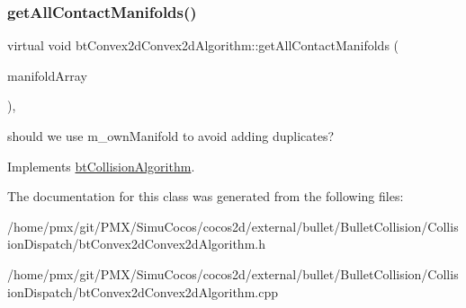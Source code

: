 \subsubsection{\texorpdfstring{get\+All\+Contact\+Manifolds()}{getAllContactManifolds()}\hspace{0.1cm}{\footnotesize\ttfamily [2/2]}}
{\footnotesize\ttfamily virtual void bt\+Convex2d\+Convex2d\+Algorithm\+::get\+All\+Contact\+Manifolds (\begin{DoxyParamCaption}\item[{\hyperlink{classbtAlignedObjectArray}{bt\+Manifold\+Array} \&}]{manifold\+Array }\end{DoxyParamCaption})\hspace{0.3cm}{\ttfamily [inline]}, {\ttfamily [virtual]}}

should we use m\+\_\+own\+Manifold to avoid adding duplicates? 

Implements \hyperlink{classbtCollisionAlgorithm}{bt\+Collision\+Algorithm}.



The documentation for this class was generated from the following files\+:\begin{DoxyCompactItemize}
\item 
/home/pmx/git/\+P\+M\+X/\+Simu\+Cocos/cocos2d/external/bullet/\+Bullet\+Collision/\+Collision\+Dispatch/bt\+Convex2d\+Convex2d\+Algorithm.\+h\item 
/home/pmx/git/\+P\+M\+X/\+Simu\+Cocos/cocos2d/external/bullet/\+Bullet\+Collision/\+Collision\+Dispatch/bt\+Convex2d\+Convex2d\+Algorithm.\+cpp\end{DoxyCompactItemize}
